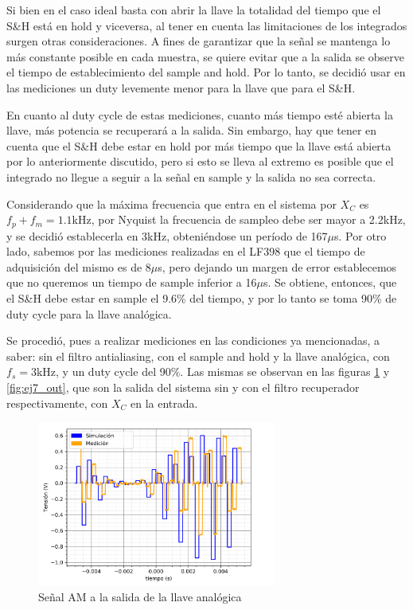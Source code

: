 \documentclass[a4paper]{article}
\begin{document}
Si bien en el caso ideal basta con abrir la llave la totalidad del tiempo que el S\&H est\'a en hold y viceversa, al tener en cuenta las limitaciones de los integrados surgen otras consideraciones. A fines de garantizar que la se\~nal se mantenga lo m\'as constante posible en cada muestra, se quiere evitar que a la salida se observe el tiempo de establecimiento del sample and hold. Por lo tanto, se decidi\'o usar en las mediciones un duty levemente menor para la llave que para el S\&H.

En cuanto al duty cycle de estas mediciones, cuanto m\'as tiempo est\'e abierta la llave, m\'as potencia se recuperar\'a a la salida. 
Sin embargo, hay que tener en cuenta que el S\&H debe estar en hold por m\'as tiempo que la llave est\'a abierta por lo anteriormente discutido, pero si esto se lleva al extremo es posible que el integrado no llegue a seguir a la se\~nal en sample y la salida no sea correcta. 

Considerando que la m\'axima frecuencia que entra en el sistema por $X_C$ es $f_p+f_m=1.1$kHz, por Nyquist la frecuencia de sampleo debe ser mayor a 2.2kHz, y se decidi\'o establecerla en 3kHz, obteni\'endose un per\'iodo de 167$\mu$s. Por otro lado, sabemos por las mediciones realizadas en el LF398 que el tiempo de adquisici\'on del mismo es de 8$\mu$s, pero dejando un margen de error establecemos que no queremos un tiempo de sample inferior a 16$\mu$s. Se obtiene, entonces, que el S\&H debe estar en sample el 9.6\% del tiempo, y por lo tanto se toma 90\% de duty cycle para la llave anal\'ogica. 

Se procedi\'o, pues a realizar mediciones en las condiciones ya mencionadas, a saber: sin el filtro antialiasing, con el sample and hold y la llave anal\'ogica, con $f_s=3$kHz, y un duty cycle del 90\%. Las mismas se observan en las figuras \ref{fig:ej7_llave} y \ref{fig:ej7_out}, que son la salida del sistema sin y con el filtro recuperador respectivamente, con $X_C$ en la entrada.

\begin{figure}[htp]
	\centering
	\includegraphics[width=0.7\textwidth]{ej7_meds/med_21.png}
	\caption{Se\~nal AM a la salida de la llave anal\'ogica}
	\label{fig:ej7_llave}
\end{figure}
\end{document}
